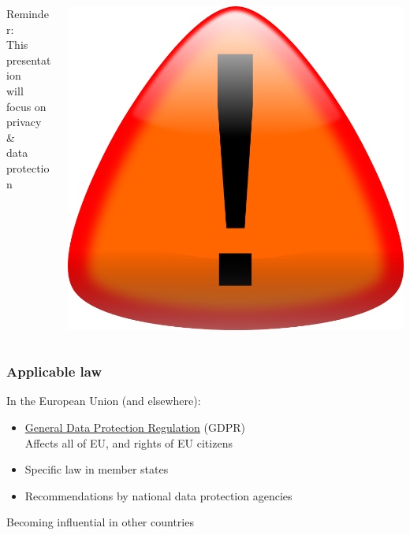 \documentclass[17pt,aspectratio=169,hyperref={pdfusetitle,colorlinks,allcolors=olive}]{beamer}
\begin{document}
\begin{frame}[fragile]

\begin{columns}[T]
\begin{column}{.78\textwidth}
  {\huge Reminder: \\
    This presentation \\ will focus on \\
    privacy  \& \\ data protection \\}
\end{column}%
\hfill%
\begin{column}{.20\textwidth}
    \includegraphics[height=\textwidth]{figs/signal-caution}
\end{column}%
\end{columns}

\end{frame}


\begin{frame}[fragile]
  \frametitle{Applicable law}

  In the European Union (and elsewhere):
  
  \begin{itemize}
  \item \href{https://gdpr.eu/}{General Data Protection Regulation} (GDPR) \\
    Affects all of EU, and rights of EU citizens
  \item Specific law in member states
  \item Recommendations by national data protection agencies
  \end{itemize}

  Becoming influential in other countries
\end{frame}
\end{document}

